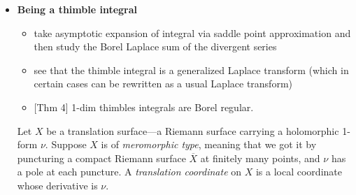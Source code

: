 \documentclass{article}
\begin{document}
\begin{itemize}
\begin{itemize}
where the arrow in red are a consequence of multisummability. In addition, we can distinguish on the right hand side of the diagram the formal solutions and on the left hand side the holomorphic ones. On the upper part of the diagram the functions in the $z$-plane while on the lower part the functions in the Borel plane $\zeta$-plane.
\item here is the way 
there are many ways to see this porblem have a distinguished base of solutions, Poincar\'e see it formally in the $z$-plane, Ecalle figured it out how to see it formally in the Borel plane, our results shows how to see it analytically in  the Borel plane.
\item  M.A.E.T. says you can start in formal $z$-plane but it is not really constructive (see Balser chap 14); going from formal $\zeta$ to analytic is constructive and it's essentially Borel-Laplace summation. Our method uses just Laplace transform. 
\item How do we know we are picking the same frame? from properties of Laplace transform we get solution asymptotics to Poincar\'e frame. From uniqueness result we get a frame equivalent to Ecalle's frame. 
\item multi-summability is a regularity result starting form the formal solution in the $z$-plane. Borel regularity is instead based on the analytic solution in the $z$-plane. The argument we gave about getting the same frame is what proves Borel regularity of $\Psi_j$.   
\end{itemize}

\item \textbf{Being a thimble integral}

\begin{itemize}
\item take asymptotic expansion of integral via saddle point approximation and then study the Borel Laplace sum of the divergent series
\item see that the thimble integral is a generalized Laplace transform (which in certain cases can be rewritten as a usual Laplace transform)
\item {[Thm 4]} 1-dim thimbles integrals are Borel regular.
\end{itemize}

Let $X$ be a translation surface---a Riemann surface carrying a holomorphic 1-form $\nu$. Suppose $X$ is of {\em meromorphic type}, meaning that we got it by puncturing a compact Riemann surface $\overline{X}$ at finitely many points, and $\nu$ has a pole at each puncture. A {\em translation coordinate} on $X$ is a local coordinate whose derivative is $\nu$.


\end{itemize}
\end{document}
